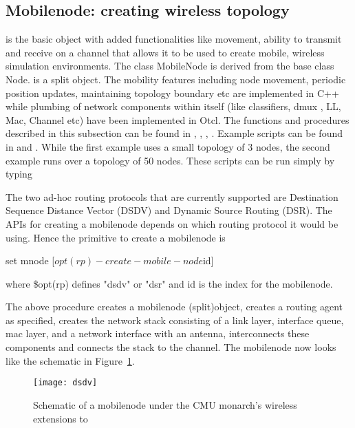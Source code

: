 \subsection{Mobilenode: creating wireless topology}
\label{sec:mobilenode-creation}

 is the basic \ns {} object with added functionalities like movement, ability to transmit and receive on a channel that allows it to be used to create mobile, wireless simulation environments.
The class MobileNode is derived from the base class Node.  is a split object. The mobility features including node movement, periodic position updates, maintaining topology boundary etc are implemented in C++ while plumbing of network components within  itself (like classifiers, dmux , LL, Mac, Channel etc) have been implemented in Otcl.
The functions and procedures described in this subsection can be found in , , , .
Example scripts can be found in  and . While the first example uses a small topology of 3 nodes, the second example runs over a topology of 50 nodes. These scripts can be run simply by typing


The two ad-hoc routing protocols that are currently supported are Destination Sequence Distance Vector (DSDV) and Dynamic Source Routing (DSR). The APIs for creating a mobilenode depends on which routing protocol it would be using. Hence the primitive to create a mobilenode is

\begin{program}
	set mnode [$opt(rp)-create-mobile-node $id] 
\end{program}
where \$opt(rp) defines "dsdv" or "dsr" and id is the index for the mobilenode.

The above procedure creates a mobilenode (split)object, creates a routing agent as specified, creates the network stack consisting of a link layer, interface queue, mac layer, and a network interface with an antenna, interconnects these components and connects the stack to the channel. The mobilenode now looks like the schematic in Figure~\ref{fig:mobilenode-dsdv}. 
\begin{figure}
    \centerline{\texttt{[image: dsdv]}}
    \caption{Schematic of a mobilenode under the CMU monarch's wireless extensions to \ns}
    \label{fig:mobilenode-dsdv}
\end{figure}

